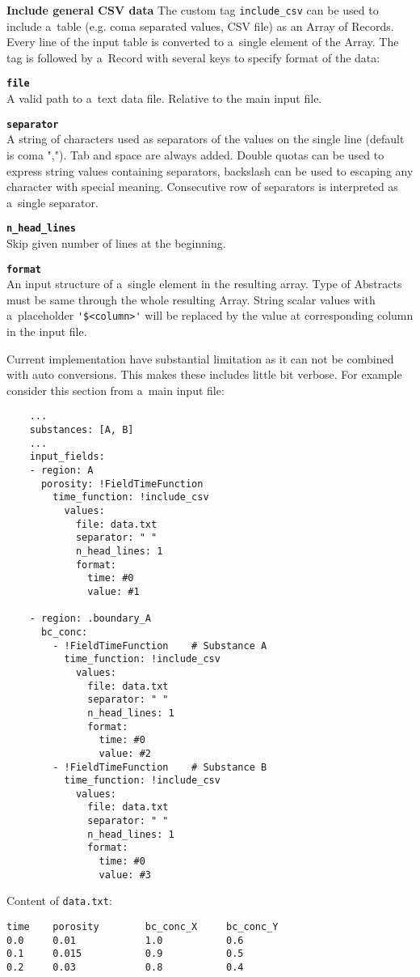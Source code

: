 {\bf Include general CSV data}
The custom tag \verb'include_csv' can be used to include a~table (e.g. coma separated values, CSV file) as an Array of Records. 
Every line of the input table is converted to a~single element of the Array.
The tag is followed by a~Record with several keys to specify format of the data:
\begin{description}
  \item {\bf\verb'file'} \\A valid path to a~text data file. Relative to the main input file.
  \item {\bf\verb'separator'}\\ A string of characters used as separators of the values on the single line (default is coma ",").
  Tab and space are always added. Double quotas can be used to express string values containing separators, 
  backslash can be used to escaping any character with special meaning. Consecutive row of separators is interpreted as a~single separator. 
  \item {\bf\verb'n_head_lines'}\\ Skip given number of lines at the beginning.
  \item {\bf\verb'format'}\\ An input structure of a~single element in the resulting array. Type of Abstracts must be same through 
  the whole resulting Array. String scalar values with a~placeholder \verb"'$<column>'" will be replaced by the value 
  at corresponding column in the input file.
\end{description}

Current implementation have substantial limitation as it can not be combined with auto conversions. This makes these includes
little bit verbose. For example consider this section from a~main input file:
\begin{verbatim}
    ...
    substances: [A, B]
    ...    
    input_fields:
    - region: A
      porosity: !FieldTimeFunction
        time_function: !include_csv
          values:
            file: data.txt  
            separator: " "
            n_head_lines: 1
            format: 
              time: #0
              value: #1
              
    - region: .boundary_A        
      bc_conc: 
        - !FieldTimeFunction    # Substance A
          time_function: !include_csv
            values:
              file: data.txt  
              separator: " "
              n_head_lines: 1
              format: 
                time: #0
                value: #2
        - !FieldTimeFunction    # Substance B
          time_function: !include_csv
            values:
              file: data.txt  
              separator: " "
              n_head_lines: 1
              format: 
                time: #0
                value: #3
\end{verbatim}
Content of \verb'data.txt':
\begin{verbatim}
time    porosity        bc_conc_X     bc_conc_Y
0.0     0.01            1.0           0.6
0.1     0.015           0.9           0.5
0.2     0.03            0.8           0.4
\end{verbatim}

